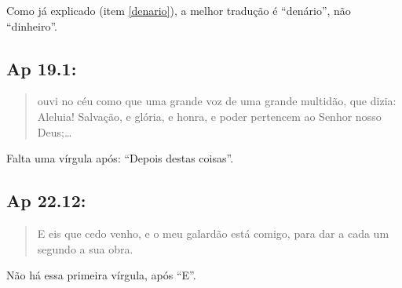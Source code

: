 Como já explicado (item \ref{denario}), a melhor tradução é ``denário'', não ``dinheiro''.

\subsection*{Ap 19.1:}
\begin{quote}
    \small
{} ouvi no céu como que uma grande voz de uma grande multidão, que dizia: Aleluia! Salvação, e glória, e honra, e poder pertencem ao Senhor nosso Deus;\ldots
\end{quote}

Falta uma vírgula após: ``Depois destas coisas''.

\subsection*{Ap 22.12:}
\begin{quote}
    \small
E\uwave{,} eis que cedo venho, e o meu galardão está comigo, para dar a cada um segundo a sua obra.
\end{quote}

Não há essa primeira vírgula, após ``E''.
